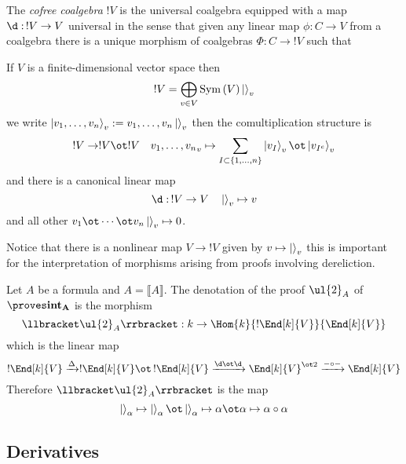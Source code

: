 \documentclass[12pt]{article}
\newcommand{\br}[1]{\llbracket #1 \rrbracket}
\begin{document}
\begin{defn}
The \textit{cofree coalgebra} $!V$ is the universal coalgebra equipped with a map $\d : \, ! V \to V$ universal in the sense that given any linear map $\phi : C \to V$ from a coalgebra there is a unique morphism of coalgebras $\Phi : C \to !V$ such that
\begin{center}
\end{center}
If $V$ is a finite-dimensional vector space then
\[ !V = \bigoplus_{v \in V} \Sym{V} \ket{\empty}_v \]
we write $\ket{v_1, \dots, v_n}_v := v_1, \dots, v_n \ket{\empty}_v$ then the comultiplication structure is
\[ ! V \to ! V \ot ! V \quad {v_1, \dots, v_n}_v \mapsto \sum_{I \subset \{1, \dots, n \}} \ket{v_I}_v \ot \ket{v_{I^c}}_v \]
and there is a canonical linear map
\[ \d : \, !V \to V \quad \ket{\empty}_v \mapsto v \]
and all other $v_1 \ot \cdots \ot v_n \ket{\empty}_v \mapsto 0$. 
\end{defn}

\begin{rmk}
Notice that there is a nonlinear map $V \to ! V$ given by $v \mapsto \ket{\empty}_v$ this is important for the interpretation of morphisms arising from proofs involving dereliction.
\end{rmk}

\begin{example}
Let $A$ be a formula and $A = \br{A}$. The denotation of the proof $\ul{2}_A$ of $\proves \bf{int}_A$ is the morphism
\[ \br{\ul{2}_A} : k \to \Hom{k}{! \End[k]{V}}{\End[k]{V}} \]
which is the linear map
\[ ! \End[k]{V} \xrightarrow{\Delta} ! \End[k]{V} \ot \, ! \End[k]{V} \xrightarrow{\d \ot \d} \End[k]{V}^{\ot 2} \xrightarrow{- \circ -} \End[k]{V} \]
Therefore $\br{\ul{2}_A}$ is the map
\[ \ket{\empty}_\alpha \mapsto \ket{\empty}_\alpha \ot \ket{\empty}_\alpha \mapsto \alpha \ot \alpha \mapsto \alpha \circ \alpha \]
\end{example}

\subsection{Derivatives}

\newcommand{\Spec}[1]{\mathrm{Spec}\left( #1 \right)}
\newcommand{\T}{\mathcal{T}}
\end{document}
